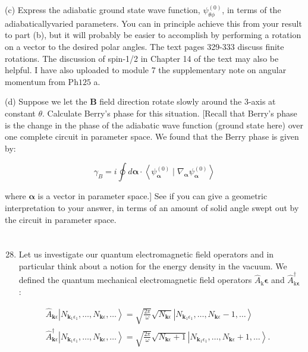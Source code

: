 \documentclass[12pt]{article}
\begin{document}
(c) Express the adiabatic ground state wave function, $\psi_{\theta \phi}^{(0)}$, in terms of the adiabaticallyvaried parameters. You can in principle achieve this from your result to part (b), but it will probably be easier to accomplish by performing a rotation on a vector to the desired polar angles. The text pages 329-333 discuss finite rotations. The discussion of spin-1/2 in Chapter 14 of the text may also be helpful. I have also uploaded to module 7 the supplementary note on angular momentum from $\mathrm{Ph} 125$ a.

(d) Suppose we let the $\mathbf{B}$ field direction rotate slowly around the 3-axis at constant $\theta$. Calculate Berry's phase for this situation. [Recall that Berry's phase is the change in the phase of the adiabatic wave function (ground state here) over one complete circuit in parameter space. We found that the Berry phase is given by:


\begin{equation*}
\gamma_{B}=i \oint d \boldsymbol{\alpha} \cdot\left\langle\psi_{\boldsymbol{\alpha}}^{(0)} \mid \nabla_{\boldsymbol{\alpha}} \psi_{\boldsymbol{\alpha}}^{(0)}\right\rangle \tag{4}
\end{equation*}


where $\boldsymbol{\alpha}$ is a vector in parameter space.] See if you can give a geometric interpretation to your answer, in terms of an amount of solid angle swept out by the circuit in parameter space.
\section{}
\begin{enumerate}
  \setcounter{enumi}{27}
  \item Let us investigate our quantum electromagnetic field operators and in particular think about a notion for the energy density in the vacuum. We defined the quantum mechanical electromagnetic field operators $\hat{A}_{\mathrm{k}} \boldsymbol{\epsilon}$ and $\hat{A}_{\mathrm{k} \boldsymbol{\epsilon}}^{\dagger}$ :
\end{enumerate}


\begin{align*}
& \hat{A}_{\mathbf{k} \epsilon}\left|N_{\mathbf{k}_{1} \epsilon_{1}}, \ldots, N_{\mathbf{k} \epsilon}, \ldots\right\rangle=\sqrt{\frac{2 \pi}{\omega}} \sqrt{N_{\mathbf{k} \epsilon}}\left|N_{\mathbf{k}_{1} \epsilon_{1}}, \ldots, N_{\mathbf{k} \epsilon}-1, \ldots\right\rangle  \tag{5}\\
& \hat{A}_{\mathbf{k} \epsilon}^{\dagger}\left|N_{\mathbf{k}_{1} \epsilon_{1}}, \ldots, N_{\mathbf{k} \epsilon}, \ldots\right\rangle=\sqrt{\frac{2 \pi}{\omega}} \sqrt{N_{\mathbf{k} \epsilon}+1}\left|N_{\mathbf{k}_{1} \epsilon_{1}}, \ldots, N_{\mathbf{k} \epsilon}+1, \ldots\right\rangle . \tag{6}
\end{align*}
\end{document}
